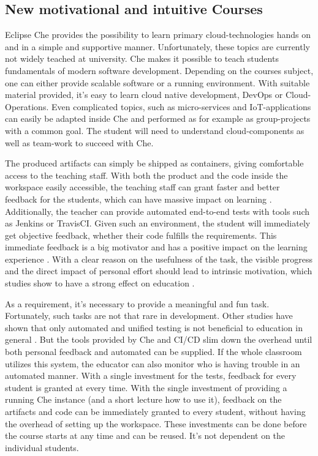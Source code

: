 \documentclass[english,utf8]{lni}
\begin{document}
\subsection{New motivational and intuitive Courses}
Eclipse Che provides the possibility to learn primary cloud-technologies hands on and in a simple and supportive manner. 
Unfortunately, these topics are currently not widely teached at university.
Che makes it possible to teach students fundamentals of modern software development.
Depending on the courses subject, one can either provide scalable software or a running environment. 
With suitable material provided, it's easy to learn cloud native development, DevOps or Cloud-Operations. 
Even complicated topics, such as micro-services and IoT-applications can easily be adapted inside Che \cite{IV18} and performed as for example as group-projects with a common goal. 
The student will need to understand cloud-components as well as team-work to succeed with Che. 

The produced artifacts can simply be shipped as containers, giving comfortable access to the teaching staff. 
With both the product and the code inside the workspace easily accessible, the teaching staff can grant faster and better feedback for the students, which can have massive impact on learning \cite{HU95}\cite{HU18}.
Additionally, the teacher can provide automated end-to-end tests with tools such as Jenkins or TravisCI. 
Given such an environment, the student will immediately get objective feedback, whether their code fulfills the requirements. 
This immediate feedback is a big motivator and has a positive impact on the learning experience \cite{FI05}. 
With a clear reason on the usefulness of the task, the visible progress and the direct impact of personal effort should lead to intrinsic motivation, which studies show to have a strong effect on education \cite{DECI93}. 

As a requirement, it's necessary to provide a meaningful and fun task. 
Fortunately, such tasks are not that rare in development.  
Other studies have shown that only automated and unified testing is not beneficial to education in general \cite{TC88}. 
But the tools provided by Che and CI/CD slim down the overhead until both personal feedback and automated can be supplied. 
If the whole classroom utilizes this system, the educator can also monitor who is having trouble in an automated manner. 
With a single investment for the tests, feedback for every student is granted at every time. 
With the single investment of providing a running Che instance (and a short lecture how to use it), feedback on the artifacts and code can be immediately granted to every student, without having the overhead of setting up the workspace. 
These investments can be done before the course starts at any time and can be reused.
It's not dependent on the individual students. 
\end{document}
